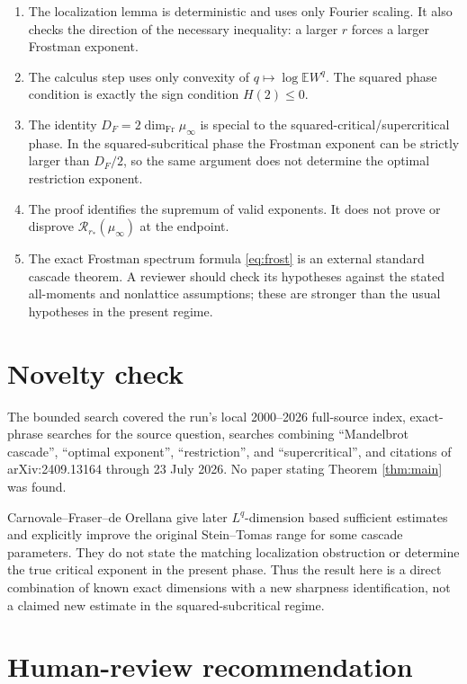 \documentclass[11pt]{article}
\newcommand{\E}{\mathbb E}
\newcommand{\muinf}{\mu_\infty}
\begin{document}
\begin{enumerate}[leftmargin=*]
\item The localization lemma is deterministic and uses only Fourier scaling.
It also checks the direction of the necessary inequality: a larger \(r\)
forces a larger Frostman exponent.
\item The calculus step uses only convexity of
\(q\mapsto\log\E W^q\).  The squared phase condition is exactly the sign
condition \(H(2)\leq0\).
\item The identity \(D_F=2\dim_{\mathrm{Fr}}\muinf\) is special to the
squared-critical/supercritical phase.  In the squared-subcritical phase the
Frostman exponent can be strictly larger than \(D_F/2\), so the same argument
does not determine the optimal restriction exponent.
\item The proof identifies the supremum of valid exponents.  It does not
prove or disprove \(\mathcal R_{r_*}(\muinf)\) at the endpoint.
\item The exact Frostman spectrum formula \eqref{eq:frost} is an external
standard cascade theorem.  A reviewer should check its hypotheses against
the stated all-moments and nonlattice assumptions; these are stronger than
the usual hypotheses in the present regime.
\end{enumerate}

\section{Novelty check}

The bounded search covered the run's local 2000--2026 full-source index,
exact-phrase searches for the source question, searches combining
``Mandelbrot cascade'', ``optimal exponent'', ``restriction'', and
``supercritical'', and citations of arXiv:2409.13164 through 23 July 2026.
No paper stating Theorem \ref{thm:main} was found.

Carnovale--Fraser--de Orellana \cite{CFdO} give later \(L^q\)-dimension based
sufficient estimates and explicitly improve the original Stein--Tomas range
for some cascade parameters.  They do not state the matching localization
obstruction or determine the true critical exponent in the present phase.
Thus the result here is a direct combination of known exact dimensions with
a new sharpness identification, not a claimed new estimate in the
squared-subcritical regime.

\section{Human-review recommendation}
\end{document}
